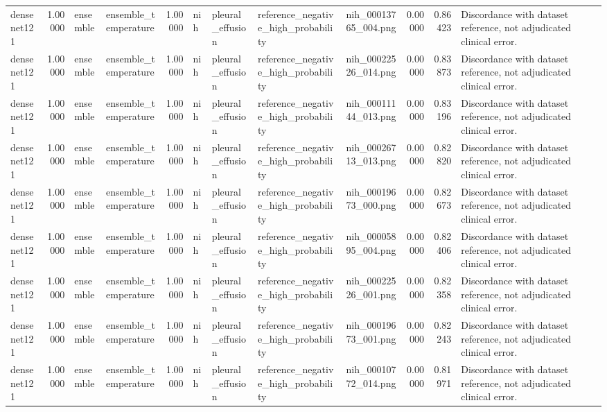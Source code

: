 \begin{tabular}{lrllrllllrrl}
densenet121 & 1.00000 & ensemble & ensemble\_temperature & 1.00000 & nih & pleural\_effusion & reference\_negative\_high\_probability & nih\_00013765\_004.png & 0.00000 & 0.86423 & Discordance with dataset reference, not adjudicated clinical error. \\
densenet121 & 1.00000 & ensemble & ensemble\_temperature & 1.00000 & nih & pleural\_effusion & reference\_negative\_high\_probability & nih\_00022526\_014.png & 0.00000 & 0.83873 & Discordance with dataset reference, not adjudicated clinical error. \\
densenet121 & 1.00000 & ensemble & ensemble\_temperature & 1.00000 & nih & pleural\_effusion & reference\_negative\_high\_probability & nih\_00011144\_013.png & 0.00000 & 0.83196 & Discordance with dataset reference, not adjudicated clinical error. \\
densenet121 & 1.00000 & ensemble & ensemble\_temperature & 1.00000 & nih & pleural\_effusion & reference\_negative\_high\_probability & nih\_00026713\_013.png & 0.00000 & 0.82820 & Discordance with dataset reference, not adjudicated clinical error. \\
densenet121 & 1.00000 & ensemble & ensemble\_temperature & 1.00000 & nih & pleural\_effusion & reference\_negative\_high\_probability & nih\_00019673\_000.png & 0.00000 & 0.82673 & Discordance with dataset reference, not adjudicated clinical error. \\
densenet121 & 1.00000 & ensemble & ensemble\_temperature & 1.00000 & nih & pleural\_effusion & reference\_negative\_high\_probability & nih\_00005895\_004.png & 0.00000 & 0.82406 & Discordance with dataset reference, not adjudicated clinical error. \\
densenet121 & 1.00000 & ensemble & ensemble\_temperature & 1.00000 & nih & pleural\_effusion & reference\_negative\_high\_probability & nih\_00022526\_001.png & 0.00000 & 0.82358 & Discordance with dataset reference, not adjudicated clinical error. \\
densenet121 & 1.00000 & ensemble & ensemble\_temperature & 1.00000 & nih & pleural\_effusion & reference\_negative\_high\_probability & nih\_00019673\_001.png & 0.00000 & 0.82243 & Discordance with dataset reference, not adjudicated clinical error. \\
densenet121 & 1.00000 & ensemble & ensemble\_temperature & 1.00000 & nih & pleural\_effusion & reference\_negative\_high\_probability & nih\_00010772\_014.png & 0.00000 & 0.81971 & Discordance with dataset reference, not adjudicated clinical error. \\

\end{tabular}
